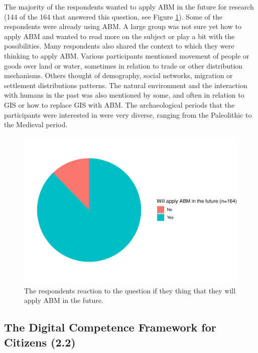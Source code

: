 \documentclass[
]{article}
\begin{document}
The majority of the respondents wanted to apply ABM in the future for research (144 of the 164 that answered this question, see Figure \ref{fig:future-abm}). Some of the respondents were already using ABM. A large group was not sure yet how to apply ABM and wanted to read more on the subject or play a bit with the possibilities. Many respondents also shared the context to which they were thinking to apply ABM. Various participants mentioned movement of people or goods over land or water, sometimes in relation to trade or other distribution mechanisms. Others thought of demography, social networks, migration or settlement distributions patterns. The natural environment and the interaction with humans in the past was also mentioned by some, and often in relation to GIS or how to replace GIS with ABM. The archaeological periods that the participants were interested in were very diverse, ranging from the Paleolithic to the Medieval period.

\begin{figure}
\includegraphics[height=0.5\textheight]{paper_files/figure-latex/future-abm-1} \caption{The respondents reaction to the question if they thing that they will apply ABM in the future.}\label{fig:future-abm}
\end{figure}

\hypertarget{the-digital-competence-framework-for-citizens-2.2}{%
\subsection{The Digital Competence Framework for Citizens (2.2)}\label{the-digital-competence-framework-for-citizens-2.2}}
\end{document}
